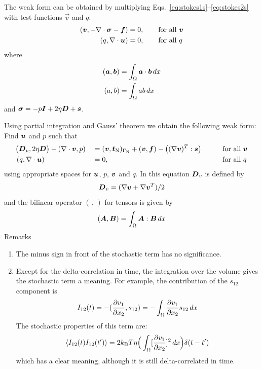The weak form can be obtained by multiplying
Eqs.~\eqref{eq:stokes1s}--\eqref{eq:stokes2s}
with test functions $\vec v$ and $q$:
\begin{align*}
 (\boldsymbol{v},-\nabla\cdot\boldsymbol{\sigma} -\boldsymbol{f})&=0,\qquad\text{for all }\boldsymbol{v}\\
  (q,\nabla\cdot\boldsymbol{u})& =0,\qquad\text{for all }q
\end{align*}
where
\begin{align*}
   (\boldsymbol{a}, \boldsymbol{b})&=\int_\Omega\boldsymbol{a}\cdot\boldsymbol{b}\,d x\\
   (a,b)&=\int_\Omega a b\,d x
\end{align*}
and $\boldsymbol{\sigma} = -p\boldsymbol{I}+2\eta\boldsymbol{D}+\boldsymbol{s}$.

Using partial integration and Gauss'
theorem we obtain the following weak form: 
Find $\boldsymbol{u}$ and $p$ such that
\begin{alignat*}{3}
  &\big(\boldsymbol{D}_v,2\eta\boldsymbol{D}\big)
    -(\nabla\cdot\boldsymbol{v},p)&&=
(\boldsymbol{v},\boldsymbol{t}_{\text{N}})_{\Gamma_{\text{N}}}+(\boldsymbol{v},\boldsymbol{f})
   -\big((\nabla\boldsymbol{v})^T:\boldsymbol{s}\big)
&\qquad&\text{for all }\boldsymbol{v}\\
  &\,(q,\nabla\cdot\boldsymbol{u})&& =0,&\qquad&\text{for all }q
\end{alignat*}
using appropriate spaces for $\boldsymbol{u}$, $p$, $\boldsymbol{v}$ and $q$. In this equation
$\boldsymbol{D}_v$ is defined by
\[
\boldsymbol{D}_v=(\nabla\boldsymbol{v}+\nabla\boldsymbol{v}^T)/2
\]
and the bilinear operator $(\,,\,)$ for tensors is given by
\[
   (\boldsymbol{A}, \boldsymbol{B})=\int_\Omega\boldsymbol{A}:\boldsymbol{B}\,d x
\]
Remarks
\begin{enumerate}[1.]
  \item The minus sign in front of the stochastic term has no significance.
  \item Except for the delta-correlation in time, the integration over the
volume gives the stochastic term a meaning. For example, the contribution of
the $s_{12}$ component is 
\begin{equation}
  I_{12}(t)=
    -(\dfrac{\partial v_1}{\partial x_2},s_{12})=-\int_\Omega\dfrac{\partial v_1}{\partial x_2}s_{12}\,d x
\end{equation}
The stochastic properties of this term are:
\begin{equation}
  \langle I_{12}(t)I_{12}(t')\rangle=
   2k_\text{B}T\eta\Big(\int_\Omega[\dfrac{\partial v_1}{\partial x_2}]^2\,d x\Big)
\delta(t-t')
\end{equation}
which has a clear meaning, although it is still delta-correlated in time.
\end{enumerate}

